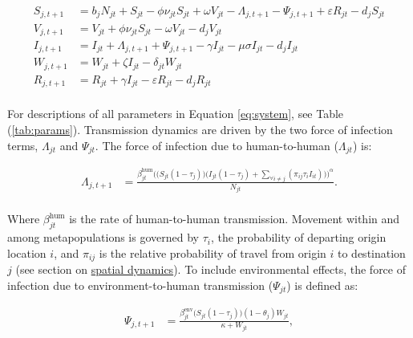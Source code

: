\documentclass[
]{book}
\begin{document}
\begin{equation}
\begin{aligned}
S_{j,t+1} &= b_j N_{jt} + S_{jt} - \phi \nu_{jt} S_{jt} + \omega V_{jt} - \Lambda_{j,t+1} - \Psi_{j,t+1} + \varepsilon R_{jt} - d_j S_{jt}\\[11pt]
V_{j,t+1} &= V_{jt} + \phi \nu_{jt} S_{jt} - \omega V_{jt} - d_j V_{jt}\\[11pt]
I_{j,t+1} &= I_{jt} + \Lambda_{j,t+1} + \Psi_{j,t+1} - \gamma I_{jt} - \mu \sigma I_{jt} - d_j I_{jt}\\[11pt]
W_{j,t+1} &= W_{jt} + \zeta I_{jt} - \delta_{jt} W_{jt}\\[11pt]
R_{j,t+1} &= R_{jt} + \gamma I_{jt} - \varepsilon R_{jt} - d_j R_{jt}\\[11pt]
\end{aligned}
\label{eq:system}
\end{equation}

For descriptions of all parameters in Equation \eqref{eq:system}, see Table (\ref{tab:params}). Transmission dynamics are driven by the two force of infection terms, \(\Lambda_{jt}\) and \(\Psi_{jt}\). The force of infection due to human-to-human (\(\Lambda_{jt}\)) is:

\begin{equation}
\begin{aligned}
\Lambda_{j,t+1} &= \frac{
\beta_{jt}^{\text{hum}} \Big(\big(S_{jt}(1-\tau_{j})\big)  \big(I_{jt}(1-\tau_{j}) + \sum_{\forall i \not= j} (\pi_{ij}\tau_iI_{it}) \big)\Big)^\alpha}{N_{jt}}.\\[11pt]
\end{aligned}
\label{eq:foi-human}
\end{equation}

Where \(\beta_{jt}^{\text{hum}}\) is the rate of human-to-human transmission. Movement within and among metapopulations is governed by \(\tau_i\), the probability of departing origin location \(i\), and \(\pi_{ij}\) is the relative probability of travel from origin \(i\) to destination \(j\) (see section on \hyperref[spatial-dynamics]{spatial dynamics}). To include environmental effects, the force of infection due to environment-to-human transmission (\(\Psi_{jt}\)) is defined as:

\begin{equation}
\begin{aligned}
\Psi_{j,t+1} &= \frac{\beta_{jt}^{\text{env}} \big(S_{jt}(1-\tau_{j})\big) (1-\theta_j) W_{jt}}{\kappa+W_{jt}},\\[11pt]
\end{aligned}
\label{eq:foi-environment}
\end{equation}
\end{document}
